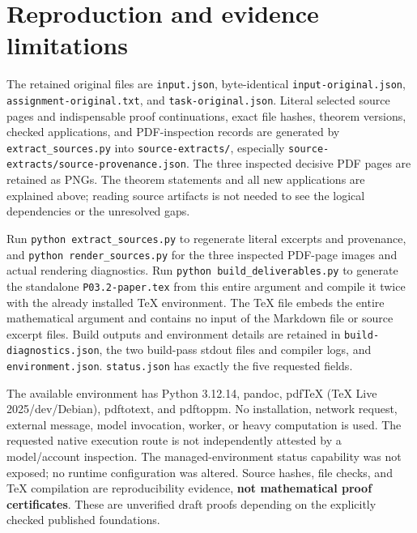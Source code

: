 \documentclass[
  11pt,
]{article}
\begin{document}
\section{Reproduction and evidence
limitations}\label{reproduction-and-evidence-limitations}

The retained original files are \texttt{input.json}, byte-identical
\texttt{input-original.json}, \texttt{assignment-original.txt}, and
\texttt{task-original.json}. Literal selected source pages and
indispensable proof continuations, exact file hashes, theorem versions,
checked applications, and PDF-inspection records are generated by
\texttt{extract\_sources.py} into \texttt{source-extracts/}, especially
\texttt{source-extracts/source-provenance.json}. The three inspected
decisive PDF pages are retained as PNGs. The theorem statements and all
new applications are explained above; reading source artifacts is not
needed to see the logical dependencies or the unresolved gaps.

Run \texttt{python\ extract\_sources.py} to regenerate literal excerpts
and provenance, and \texttt{python\ render\_sources.py} for the three
inspected PDF-page images and actual rendering diagnostics. Run
\texttt{python\ build\_deliverables.py} to generate the standalone
\texttt{P03.2-paper.tex} from this entire argument and compile it twice
with the already installed TeX environment. The TeX file embeds the
entire mathematical argument and contains no input of the Markdown file
or source excerpt files. Build outputs and environment details are
retained in \texttt{build-diagnostics.json}, the two build-pass stdout
files and compiler logs, and \texttt{environment.json}.
\texttt{status.json} has exactly the five requested fields.

The available environment has Python 3.12.14, pandoc, pdfTeX (TeX Live
2025/dev/Debian), pdftotext, and pdftoppm. No installation, network
request, external message, model invocation, worker, or heavy
computation is used. The requested native execution route is not
independently attested by a model/account inspection. The
managed-environment status capability was not exposed; no runtime
configuration was altered. Source hashes, file checks, and TeX
compilation are reproducibility evidence, \textbf{not mathematical proof
certificates}. These are unverified draft proofs depending on the
explicitly checked published foundations.
\end{document}
